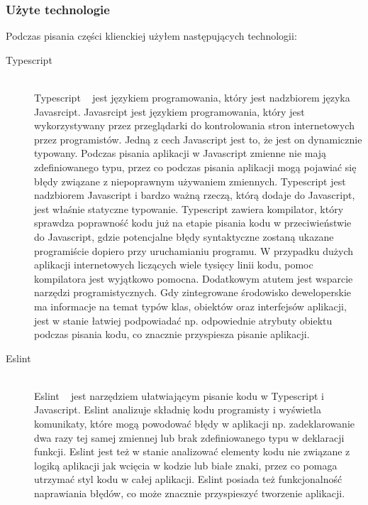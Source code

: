 \subsubsection{Użyte technologie}
Podczas pisania części klienckiej użyłem następujących technologii:
\begin{description}
  \item[Typescript] \hfill \\ Typescript ~\cite{ref_ts_doc} jest językiem programowania, który jest nadzbiorem języka Javasrcipt. Javasrcipt jest językiem programowania, który jest wykorzystywany przez przeglądarki do kontrolowania stron internetowych przez programistów. Jedną z cech Javascript jest to, że jest on dynamicznie typowany. Podczas pisania aplikacji w Javascript zmienne nie mają zdefiniowanego typu, przez co podczas pisania aplikacji mogą pojawiać się błędy związane z niepoprawnym używaniem zmiennych. Typescript jest nadzbiorem Javascript i bardzo ważną rzeczą, którą dodaje do Javascript, jest właśnie statyczne typowanie. Typescript zawiera kompilator, który sprawdza poprawność kodu już na etapie pisania kodu w przeciwieństwie do Javascript, gdzie potencjalne błędy syntaktyczne zostaną ukazane programiście dopiero przy uruchamianiu programu. W przypadku dużych aplikacji internetowych liczących wiele tysięcy linii kodu, pomoc kompilatora jest wyjątkowo pomocna. Dodatkowym atutem jest wsparcie narzędzi programistycznych. Gdy zintegrowane środowisko deweloperskie ma informacje na temat typów klas, obiektów oraz interfejsów aplikacji, jest w stanie łatwiej podpowiadać np. odpowiednie atrybuty obiektu podczas pisania kodu, co znacznie przyspiesza pisanie aplikacji.

  \vspace{0.4cm}

  \item[Eslint] \hfill \\ Eslint ~\cite{ref_eslint_doc} jest narzędziem ułatwiającym pisanie kodu w Typescript i Javascript. Eslint analizuje składnię kodu programisty i wyświetla komunikaty, które mogą powodować błędy w aplikacji np. zadeklarowanie dwa razy tej samej zmiennej lub brak zdefiniowanego typu w deklaracji funkcji. Eslint jest też w stanie analizować elementy kodu nie związane z logiką aplikacji jak wcięcia w kodzie lub białe znaki, przez co pomaga utrzymać styl kodu w całej aplikacji. Eslint posiada też funkcjonalność naprawiania błędów, co może znacznie przyspieszyć tworzenie aplikacji.

  \vspace{0.4cm}


\end{description}
